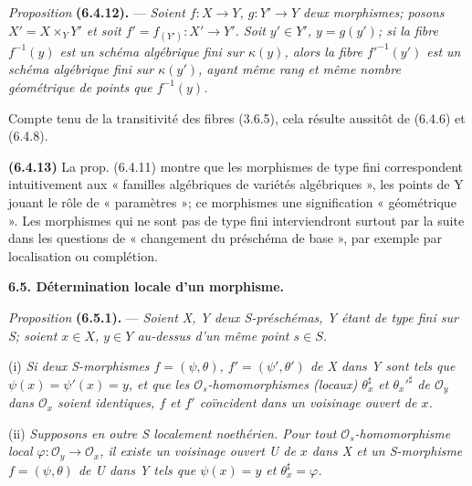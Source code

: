 \textit{Proposition} \textbf{(6.4.12).} --- \textit{Soient $f:X\to Y$, $g:Y'\to Y$ deux morphismes; posons $X'=X\times_Y Y'$ et soit $f'=f_{(Y')}:X'\to Y'$. Soit $y'\in Y'$, $y=g(y')$; si la fibre $f^{-1}(y)$ est un schéma algébrique fini sur $\kappa(y)$, alors la fibre $f'^{-1}(y')$ est un schéma algébrique fini sur $\kappa(y')$, ayant même rang et même nombre géométrique de points que $f^{-1}(y)$.}

Compte tenu de la transitivité des fibres (3.6.5), cela résulte aussitôt de (6.4.6) et (6.4.8).

\textbf{(6.4.13)} La prop. (6.4.11) montre que les morphismes de type fini correspondent intuitivement aux « familles algébriques de variétés algébriques », les points de Y jouant le rôle de « paramètres »; ce  morphismes  une signification « géométrique ». Les morphismes qui ne sont pas de type fini interviendront surtout par la suite dans les questions de « changement du préschéma de base », par exemple par localisation ou complétion.
\margin{$\times$}

\textbf{6.5. Détermination locale d'un morphisme.}

\textit{Proposition} \textbf{(6.5.1).} --- \textit{Soient X, Y deux S-préschémas, Y étant de type fini sur S; soient $x\in X$, $y\in Y$ au-dessus d'un même point $s\in S$.}

(i) \textit{Si deux S-morphismes $f=(\psi,\theta)$, $f'=(\psi',\theta')$ de X dans Y sont tels que $\psi(x)=\psi'(x)=y$, et que les $\mathcal O_s$-homomorphismes (locaux) $\theta_x^\sharp$ et $\theta_x'^\sharp$ de $\mathcal O_y$ dans $\mathcal O_x$ soient identiques, $f$ et $f'$ coïncident dans un voisinage ouvert de $x$.}

(ii) \textit{Supposons en outre S localement noethérien. Pour tout $\mathcal O_s$-homomorphisme local $\varphi:\mathcal O_y\to\mathcal O_x$, il existe un voisinage ouvert U de $x$ dans X et un S-morphisme $f=(\psi,\theta)$ de U dans Y tels que $\psi(x)=y$ et $\theta_x^\sharp=\varphi$.}

